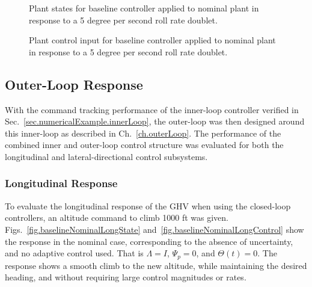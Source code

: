 \newpage
\begin{figure}[H]
  \hspace{-0.5in}
  \noindent{}
  \vspace{-1.0in}
  \caption{Plant states for baseline controller applied to nominal plant in response to a 5 degree per second roll rate doublet.\label{fig.baselineInnerNominalLatrState}}
\end{figure}

\newpage
\begin{figure}[H]
  \hspace{-0.5in}
  \noindent{}
  \vspace{-1.0in}
  \caption{Plant control input for baseline controller applied to nominal plant in response to a 5 degree per second roll rate doublet.\label{fig.baselineInnerNominalLatrControl}}
\end{figure}


\subsection{Outer-Loop Response}\label{sec.numericalExample.outerLoop}

With the command tracking performance of the inner-loop controller verified in Sec.~\ref{sec.numericalExample.innerLoop}, the outer-loop was then designed around this inner-loop as described in Ch.~\ref{ch.outerLoop}.
The performance of the combined inner and outer-loop control structure was evaluated for both the longitudinal and lateral-directional control subsystems.

\subsubsection{Longitudinal Response}

To evaluate the longitudinal response of the GHV when using the closed-loop controllers, an altitude command to climb 1000 ft was given.
Figs.~\ref{fig.baselineNominalLongState} and~\ref{fig.baselineNominalLongControl} show the response in the nominal case, corresponding to the absence of uncertainty, and no adaptive control used.
That is $\Lambda=I$, $\Psi_{p}=0$, and $\Theta(t)=0$.
The response shows a smooth climb to the new altitude, while maintaining the desired heading, and without requiring large control magnitudes or rates.

